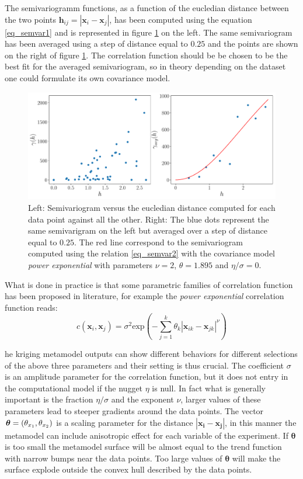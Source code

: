 The semivariogramm functions, as a function of the eucledian distance between the two points $\mathbf{h}_{ij} = |\mathbf{x}_i - \mathbf{x}_j|$, has been computed using the equation \eqref{eq_semvar1} and is represented in figure \ref{fig:semivariogram} on the left. The same semivariogram has been averaged using a step of distance equal to $0.25$ and the points are shown on the right of figure \ref{fig:semivariogram}.
The correlation function should be be chosen to be the best fit for the averaged semivariogram, so in theory depending on the dataset one could formulate its own covariance model.

\begin{figure}[h]
	\centering
	\includegraphics[width=0.9\linewidth]{appendix_a/sem}
	\caption{Left: Semivariogram versus the eucledian distance computed for each data point against all the other.  Right: The blue dots represent the same semivarigram on the left but averaged over a step of distance equal to $0.25$. The red line correspond to the semivariogram computed using the relation \eqref{eq_semvar2} with the covariance model \textit{power exponential} with parameters $\nu=2$, $\theta=1.895$ and $\eta / \sigma=0$.}
	\label{fig:semivariogram}
\end{figure}

What is done in practice is that some parametric families of correlation function has been proposed in literature, for example the \textit{power exponential} correlation function reads:
\begin{equation}
c(\mathbf{x}_{i} , \mathbf{x}_{j})  = \sigma^2 \textrm{exp}\left( -\sum_{j=1}^{k} \theta_k {|\mathbf{x}_{ik} - \mathbf{x}_{jk} |}^\nu \right)
\end{equation}

he kriging metamodel outputs can show different behaviors for different selections of the above three parameters and their setting is thus crucial.
The coefficient $\sigma$ is an amplitude parameter for the correlation function, but it does not entry in the computational model if the nugget $\eta$ is null.
In fact what is generally important is the fraction $\eta / \sigma$ and the exponent $\nu$, larger values of these parameters lead to steeper gradients around the data points. The vector $\boldsymbol{\theta}=(\theta_{x_1}, \theta_{x_2})$ is a scaling parameter for the distance $|\mathbf{x_i} - \mathbf{x_j}|$, in this manner the metamodel can include anisotropic effect for each variable of the experiment. If $\boldsymbol{\theta}$ is too small the metamodel surface will be almost equal to the trend function with narrow bumps near the data points. Too large values of $\boldsymbol{\theta}$ will make the surface explode outside the convex hull described by the data points.

